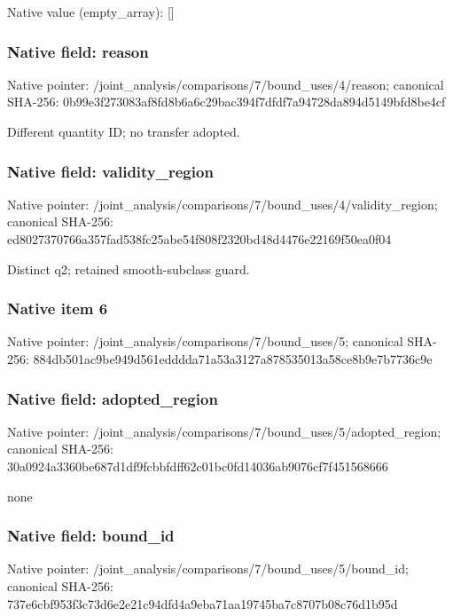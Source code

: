 \documentclass[10pt,a4paper]{article}
\begin{document}
Native value (empty\_\allowbreak{}array): []

\subsubsection{Native field: reason}
Native pointer: /joint\_\allowbreak{}analysis/comparisons/7/bound\_\allowbreak{}uses/4/reason; canonical SHA-256: 0b99e3f273083af8fd8b6a6c29bac394f7dfdf7a94728da894d5149bfd8be4cf

\begingroup\raggedright\sloppy Different quantity ID;\allowbreak{} no transfer adopted.\par\endgroup

\subsubsection{Native field: validity\_\allowbreak{}region}
Native pointer: /joint\_\allowbreak{}analysis/comparisons/7/bound\_\allowbreak{}uses/4/validity\_\allowbreak{}region; canonical SHA-256: ed8027370766a357fad538fc25abe54f808f2320bd48d4476e22169f50ea0f04

\begingroup\raggedright\sloppy Distinct q2;\allowbreak{} retained smooth-subclass guard.\par\endgroup

\subsubsection{Native item 6}
Native pointer: /joint\_\allowbreak{}analysis/comparisons/7/bound\_\allowbreak{}uses/5; canonical SHA-256: 884db501ac9be949d561edddda71a53a3127a878535013a58ce8b9e7b7736c9e

\subsubsection{Native field: adopted\_\allowbreak{}region}
Native pointer: /joint\_\allowbreak{}analysis/comparisons/7/bound\_\allowbreak{}uses/5/adopted\_\allowbreak{}region; canonical SHA-256: 30a0924a3360be687d1df9fcbbfdff62c01bc0fd14036ab9076cf7f451568666

\begingroup\raggedright\sloppy none\par\endgroup

\subsubsection{Native field: bound\_\allowbreak{}id}
Native pointer: /joint\_\allowbreak{}analysis/comparisons/7/bound\_\allowbreak{}uses/5/bound\_\allowbreak{}id; canonical SHA-256: 737e6cbf953f3c73d6e2e21c94dfd4a9eba71aa19745ba7c8707b08c76d1b95d
\end{document}
